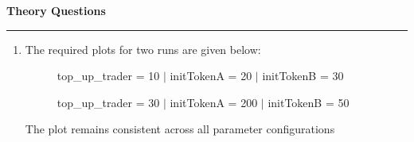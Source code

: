 \documentclass[a4paper]{article}
\newenvironment{solution}[2][]{%
\begin{mdframed}[linecolor=blue!70!black, linewidth=2pt, roundcorner=10pt, backgroundcolor=yellow!10!white, skipabove=12pt, skipbelow=12pt]%
	\textbf{\large #2}
	\par\noindent\rule{\textwidth}{0.4pt}
}{
\end{mdframed}
}
\begin{document}
\begin{solution}{Theory Questions}
\begin{enumerate}
	\item The required plots for two runs are given below:
	\begin{figure}[H]
		\centering
				\begin{minipage}{0.4\textwidth}
					\centering
					\caption{top\_up\_trader = 10 $|$ initTokenA = 20 $|$ initTokenB = 30}
				\end{minipage}
				\hspace{0.05\textwidth}
				\begin{minipage}{0.4\textwidth}
					\centering
					\caption{top\_up\_trader = 30 $|$ initTokenA = 200 $|$ initTokenB = 50}
				\end{minipage}
	\end{figure}

	The plot remains consistent across all parameter configurations
	\end{enumerate}
\end{solution}
\end{document}
